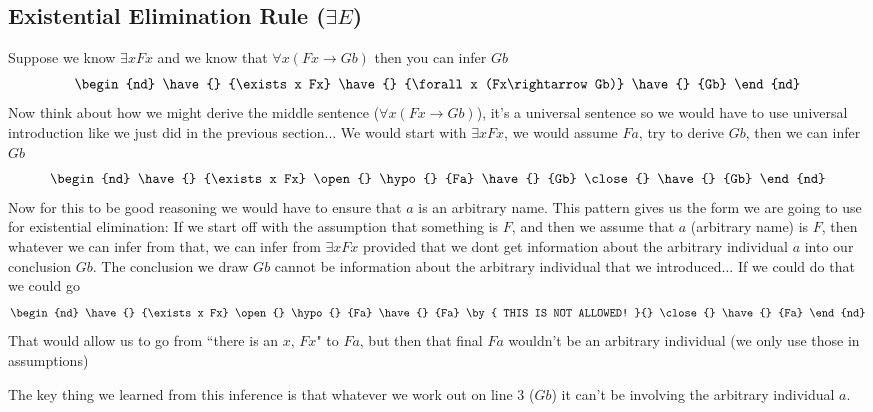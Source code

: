 \subsection{Existential Elimination Rule ($\exists E$)}
Suppose we know $\exists x Fx$ and we know that $\forall x (Fx \rightarrow Gb)$ then you can infer $Gb$
\begin{equation}
    \begin{nd}
        \have{} {\exists x Fx}
        \have{} {\forall x (Fx\rightarrow Gb)}
        \have{} {Gb}
    \end{nd} \nonumber
\end{equation}
Now think about how we might derive the middle sentence ($\forall x (Fx \rightarrow Gb)$), it's a universal sentence so we would have to use universal introduction like we just did in the previous section... We would start with $\exists x Fx$, we would assume $Fa$, try to derive $Gb$, then we can infer $Gb$
\begin{equation}
    \begin{nd}
        \have{} {\exists x Fx}
        \open{}
        \hypo{} {Fa}
        \have{} {Gb}
        \close{}
        \have{} {Gb}
    \end{nd} \nonumber
\end{equation}
Now for this to be good reasoning we would have to ensure that $a$ is an arbitrary name. This pattern gives us the form we are going to use for existential elimination: If we start off with the assumption that something is $F$, and then we assume that $a$ (arbitrary name) is $F$, then whatever we can infer from that, we can infer from $\exists x Fx$ provided that we dont get information about the arbitrary individual $a$ into our conclusion $Gb$. The conclusion we draw $Gb$ cannot be information about the arbitrary individual that we introduced... If we could do that we could go
\begin{equation}
    \begin{nd}
        \have{} {\exists x Fx}
        \open{}
        \hypo{} {Fa}
        \have{} {Fa} \by{ THIS IS NOT ALLOWED! }{}
        \close{}
        \have{} {Fa}
    \end{nd} \nonumber
\end{equation}
That would allow us to go from ``there is an $x$, $Fx$" to $Fa$, but then that final $Fa$ wouldn't be an arbitrary individual (we only use those in assumptions) 

The key thing we learned from this inference is that whatever we work out on line 3 ($Gb$) it can't be involving the arbitrary individual $a$.\\

